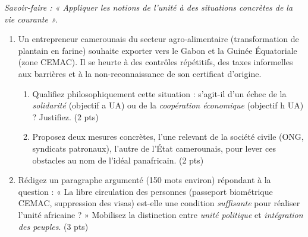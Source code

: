\documentclass[11pt]{article}
\begin{document}
\begin{exercice}
    \textit{Savoir-faire : « Appliquer les notions de l'unité à des situations concrètes de la vie courante ».}

    \begin{enumerate}
        \item Un entrepreneur camerounais du secteur agro-alimentaire (transformation de plantain en farine) souhaite exporter vers le Gabon et la Guinée Équatoriale (zone CEMAC). Il se heurte à des contrôles répétitifs, des taxes informelles aux barrières et à la non-reconnaissance de son certificat d'origine. 
        \begin{enumerate}
            \item Qualifiez philosophiquement cette situation : s'agit-il d'un échec de la \textit{solidarité} (objectif a UA) ou de la \textit{coopération économique} (objectif h UA) ? Justifiez. (2 pts)
            \item Proposez deux mesures concrètes, l'une relevant de la société civile (ONG, syndicats patronaux), l'autre de l'État camerounais, pour lever ces obstacles au nom de l'idéal panafricain. (2 pts)
        \end{enumerate}
        \item Rédigez un paragraphe argumenté (150 mots environ) répondant à la question : « La libre circulation des personnes (passeport biométrique CEMAC, suppression des visas) est-elle une condition \textit{suffisante} pour réaliser l'unité africaine ? » Mobilisez la distinction entre \textit{unité politique} et \textit{intégration des peuples}. (3 pts)
    \end{enumerate}
\end{exercice}
\end{document}
